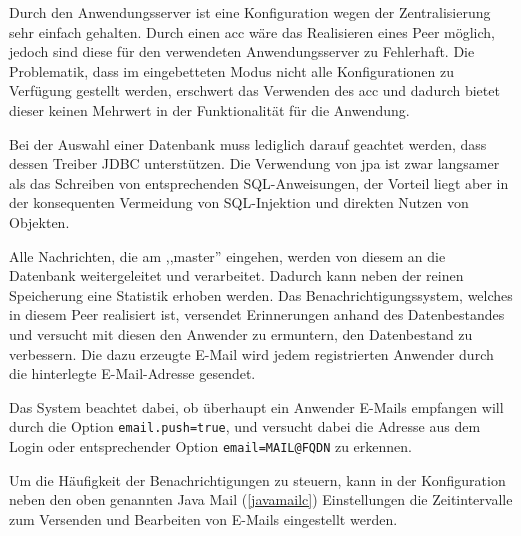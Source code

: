 \documentclass[oneside, ngerman, toc=bibliography,bibliography=totoc,listof=entryprefix, open=right,numbers=noenddot,fontsize=12pt]{scrbook}
\begin{document}
Durch den Anwendungsserver ist eine Konfiguration wegen der Zentralisierung sehr einfach gehalten. Durch einen \acrfull{acc} wäre das Realisieren eines Peer möglich, jedoch sind diese für den verwendeten Anwendungsserver zu Fehlerhaft. Die Problematik, dass im eingebetteten Modus nicht alle Konfigurationen zu Verfügung gestellt werden, erschwert das Verwenden des \acrshort{acc} und dadurch bietet dieser keinen Mehrwert in der Funktionalität für die Anwendung.

Bei der Auswahl einer Datenbank muss lediglich darauf geachtet werden, dass dessen Treiber JDBC unterstützen. 
Die Verwendung von \acrshort{jpa} ist zwar langsamer als das Schreiben von entsprechenden SQL-Anweisungen, der Vorteil liegt aber in der konsequenten Vermeidung von SQL-Injektion und direkten Nutzen von Objekten.


Alle Nachrichten, die am ,,master'' eingehen, werden von diesem an die Datenbank weitergeleitet und verarbeitet. Dadurch kann neben der reinen Speicherung eine Statistik erhoben werden. Das Benachrichtigungssystem, welches in diesem Peer realisiert ist, versendet Erinnerungen anhand des Datenbestandes und versucht mit diesen den Anwender zu ermuntern, den Datenbestand zu verbessern.
Die dazu erzeugte E-Mail wird jedem registrierten Anwender durch die hinterlegte E-Mail-Adresse gesendet.

Das System beachtet dabei, ob überhaupt ein Anwender E-Mails empfangen will durch die Option \verb|email.push=true|, und versucht dabei die Adresse aus dem Login oder entsprechender Option \verb|email=MAIL@FQDN| zu erkennen.

Um die Häufigkeit der Benachrichtigungen zu steuern, kann in der Konfiguration neben den oben genannten Java Mail (\ref{javamailc}) Einstellungen die Zeitintervalle zum Versenden und Bearbeiten von E-Mails eingestellt werden.
\end{document}
